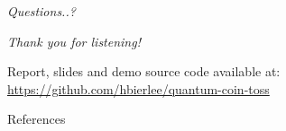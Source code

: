 \documentclass{beamer}
\begin{document}
\begin{frame}[plain,c]

\begin{center}
    \Huge \emph{Questions..?}
\end{center}

\end{frame}


\begin{frame}[plain,c]

\begin{center}
    \Huge \emph{Thank you for listening!}
    
\end{center}
\vfill
    \large
    Report, slides and demo source code available at:\\ \quad \url{https://github.com/hbierlee/quantum-coin-toss}
    
\end{frame}

\begin{frame}{References}
        
        
\end{frame}
\end{document}
